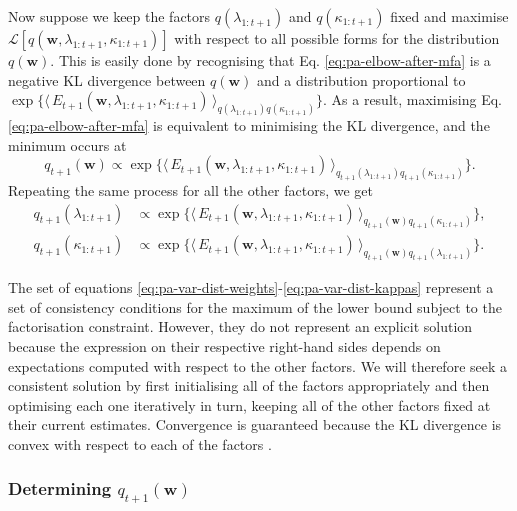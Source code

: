Now suppose we keep the factors $q(\lambda_{1:t+1})$ and $q(\kappa_{1:t+1})$ fixed and maximise $\mathcal{L}[q(\mathbf{w}, \lambda_{1:t+1}, \kappa_{1:t+1})]$ with respect to all possible forms for the distribution $q(\mathbf{w})$. This is easily done by recognising that Eq. \eqref{eq:pa-elbow-after-mfa} is a negative KL divergence between $q(\mathbf{w})$ and a distribution proportional to $\exp\{\langle\, E_{t+1}(\mathbf{w}, \lambda_{1:t+1}, \kappa_{1:t+1})\,\rangle_{q(\lambda_{1:t+1})q(\kappa_{1:t+1})}\}$.
As a result, maximising Eq. \eqref{eq:pa-elbow-after-mfa} is equivalent to minimising the KL divergence, and the minimum occurs at
\begin{equation}
\label{eq:pa-var-dist-weights}
	q_{t+1}(\mathbf{w})
	\propto \exp\Big\{\langle\, E_{t+1}(\mathbf{w}, \lambda_{1:t+1}, \kappa_{1:t+1})\,\rangle_{q_{t+1}(\lambda_{1:t+1})q_{t+1}(\kappa_{1:t+1})}\Big\}.
\end{equation}
Repeating the same process for all the other factors, we get
\begin{align}
	q_{t+1}(\lambda_{1:t+1})
	&\propto \exp\Big\{\langle\, E_{t+1}(\mathbf{w}, \lambda_{1:t+1}, \kappa_{1:t+1})\,\rangle_{q_{t+1}(\mathbf{w})q_{t+1}(\kappa_{1:t+1})}\Big\},
	\label{eq:pa-var-dist-lambdas} \\
	q_{t+1}(\kappa_{1:t+1})
	&\propto \exp\Big\{\langle\, E_{t+1}(\mathbf{w}, \lambda_{1:t+1}, \kappa_{1:t+1})\,\rangle_{q_{t+1}(\mathbf{w})q_{t+1}(\lambda_{1:t+1})}\Big\}.
	\label{eq:pa-var-dist-kappas}
\end{align}

The set of equations \eqref{eq:pa-var-dist-weights}-\eqref{eq:pa-var-dist-kappas} represent a set of consistency conditions for the maximum of the lower bound  subject to the factorisation constraint. However, they do not represent an explicit solution because the expression on their respective right-hand sides depends on expectations computed with respect to the other factors. We will therefore seek a consistent solution by first initialising all of the factors appropriately and then optimising each one iteratively in turn, keeping all of the other factors fixed at their current estimates. Convergence is guaranteed because the KL divergence is convex with respect to each of the factors \citep{bv_cvxbook}.

\subsubsection{Determining $q_{t+1}(\mathbf{w})$}

